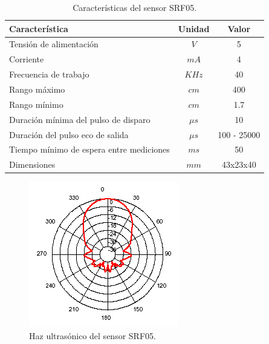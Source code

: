 \begin{table}[ht]
	\begin{center}
		\begin{tabular}{|l|c|c|}
			\hline
			Caracter\'istica & Unidad & Valor\\
			\hline
			Tensi\'on de alimentaci\'on & $V$ & 5 \\
			Corriente & $mA$ & 4 \\
			Frecuencia de trabajo & $KHz$ & 40 \\
			Rango m\'aximo & $cm$ & 400 \\
			Rango m\'inimo & $cm$ & 1.7 \\
			Duraci\'on m\'inima del pulso de disparo & $\mu s$ & 10 \\
			Duraci\'on del pulso eco de salida & $\mu s$& 100 - 25000 \\
			Tiempo m\'inimo de espera entre mediciones & $m s$ & 50 \\
			Dimensiones & $mm$ & 43x23x40 \\
			\hline
		\end{tabular}
	\end{center}
	\caption{Caracter\'isticas del sensor SRF05.}
	\label{hT_srf05}
\end{table}

\begin{figure}[ht]
	\centering
	\includegraphics[scale=0.5]{srf05_beam.png}
	\caption{Haz ultras\'onico del sensor SRF05.}
	\label{hF_srf05}
\end{figure}


